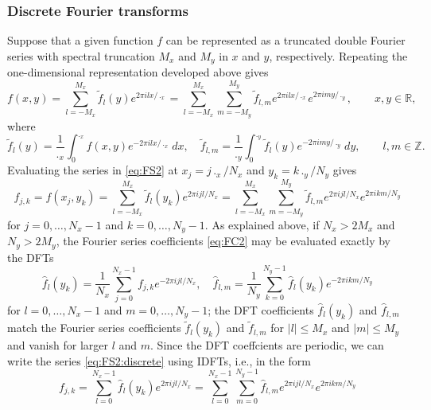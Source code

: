 \documentclass[12pt]{article}
\newcommand{\R}{\mathbb{R}}
\newcommand{\Z}{\mathbb{Z}}
\newcommand{\abs}[1]{\left|{#1}\right|}
\newcommand{\fc}[1]{\widetilde{#1}} %
\newcommand{\dfc}[1]{\widehat{#1}}  %
\newcommand{\Fc}[1]{\dfc{#1}}       %
\begin{document}
\subsubsection{Discrete Fourier transforms}

Suppose that a given function $f$ can be represented as a truncated double
Fourier series with spectral truncation $M_x$ and $M_y$ in $x$ and $y$,
respectively.  Repeating the one-dimensional representation developed above
gives
\begin{equation}
   f(x,y) = \sum_{l=-M_x}^{M_x} \fc{f}_{l}(y) e^{2\pi ilx/\period_x}
          = \sum_{l=-M_x}^{M_x} \sum_{m=-M_y}^{M_y}
      \fc{f}_{l,m} e^{2\pi ilx/\period_x} e^{2\pi imy/\period_y},
\qquad x,y\in\R,
\label{eq:FS2}
\end{equation}
where
\begin{equation}
   \fc{f}_l(y) = \frac{1}{\period_x}\int_{0}^{\period_x} f(x,y) 
              e^{-2\pi ilx/\period_x} \,dx ,
\quad
   \fc{f}_{l,m} = \frac{1}{\period_y}\int_{0}^{\period_y} \fc{f}_l(y) 
              e^{-2\pi imy/\period_y} \,dy ,
\qquad l,m\in\Z.
\label{eq:FC2}
\end{equation}
Evaluating the series in \eqref{eq:FS2} at $x_j=j\period_x/N_x$ and
$y_k=k\period_y/N_y$ gives
\begin{equation}
   f_{j,k} = f(x_j,y_k) = \sum_{l=-M_x}^{M_x} \fc{f}_{l}(y_k) e^{2\pi ijl/N_x}
          = \sum_{l=-M_x}^{M_x} \sum_{m=-M_y}^{M_y}
      \fc{f}_{l,m} e^{2\pi ijl/N_x} e^{2\pi ikm/N_y}
\label{eq:FS2:discrete}
\end{equation}
for $j=0,\dots,N_x-1$ and $k=0,\dots,N_y-1$.
As explained above, if $N_x>2M_x$ and $N_y>2M_y$, the Fourier series
coefficients \eqref{eq:FC2} may be evaluated exactly by the DFTs
\begin{equation}
   \Fc{f}_l(y_k) = \frac{1}{N_x}\sum_{j=0}^{N_x-1} f_{j,k}
              e^{-2\pi ijl/N_x} ,
\quad
   \Fc{f}_{l,m} = \frac{1}{N_y}\sum_{k=0}^{N_y-1} \Fc{f}_l(y_k) 
              e^{-2\pi ikm/N_y} 
\label{eq:DFT2}
\end{equation}
for $l=0,\dots,N_x-1$ and $m=0,\dots,N_y-1$; the DFT coefficients
$\Fc{f}_l(y_k)$ and $\Fc{f}_{l,m}$ match the Fourier series coefficients
$\fc{f}_l(y_k)$ and $\fc{f}_{l,m}$ for $\abs{l}\le M_x$ and $\abs{m}\le M_y$
and vanish for larger $l$ and $m$.  Since the DFT coeffcients are periodic, we
can write the series \eqref{eq:FS2:discrete} using IDFTs, i.e., in the form
\begin{equation}
   f_{j,k} = \sum_{l=0}^{N_x-1} \Fc{f}_{l}(y_k) e^{2\pi ijl/N_x}
          = \sum_{l=0}^{N_x-1} \sum_{m=0}^{N_y-1}
      \Fc{f}_{l,m} e^{2\pi ijl/N_x} e^{2\pi ikm/N_y}
\label{eq:IDFT2}
\end{equation}
\end{document}
